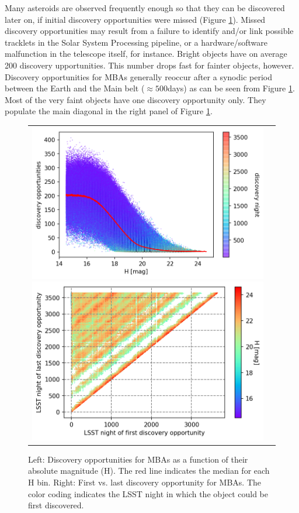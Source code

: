 %
Many asteroids are observed frequently enough so that they can be discovered later on, if initial discovery opportunities were missed (Figure \ref{fig:do}). Missed discovery opportunities may result from a failure to identify and/or link possible tracklets in the Solar System Processing pipeline, or a hardware/software malfunction in the telescope itself, for instance. Bright objects have on average 200 discovery upportunities. This number drops fast for fainter objects, however. Discovery opportunities for MBAs generally reoccur after a synodic period between the Earth and the Main belt ($\approx 500$days) as can be seen from Figure \ref{fig:do}. Most of the very faint objects have one discovery opportunity only. They populate the main diagonal in the right panel of Figure \ref{fig:do}. 
%
\begin{figure}[tb!]
\begin{tabular}{ll}
\includegraphics[width=0.5\linewidth]{figs/disc_opport3.png}
\includegraphics[width=0.5\linewidth]{figs/first_vs_last.png} &
\end{tabular}
\caption{Left: Discovery opportunities for MBAs as a function of their absolute magnitude (H). The red line indicates the median for each H bin. Right: First vs. last discovery opportunity for MBAs. The color coding indicates the LSST night in which the object could be first discovered.}
\label{fig:do}       %
\end{figure}
\clearpage
